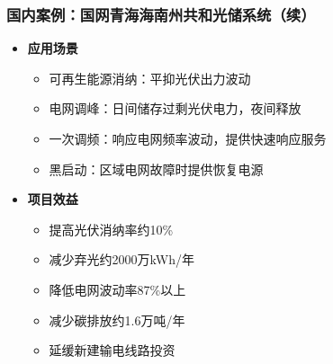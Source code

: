 \documentclass[aspectratio=169]{beamer}
\begin{document}
\begin{frame}
    \frametitle{国内案例：国网青海海南州共和光储系统（续）}
    \begin{itemize}
        \item \textbf{应用场景}
        \begin{itemize}
            \item 可再生能源消纳：平抑光伏出力波动
            \item 电网调峰：日间储存过剩光伏电力，夜间释放
            \item 一次调频：响应电网频率波动，提供快速响应服务
            \item 黑启动：区域电网故障时提供恢复电源
        \end{itemize}
        
        \item \textbf{项目效益}
        \begin{itemize}
            \item 提高光伏消纳率约10\%
            \item 减少弃光约2000万kWh/年
            \item 降低电网波动率87\%以上
            \item 减少碳排放约1.6万吨/年
            \item 延缓新建输电线路投资
        \end{itemize}
    \end{itemize}
\end{frame}
\end{document}
